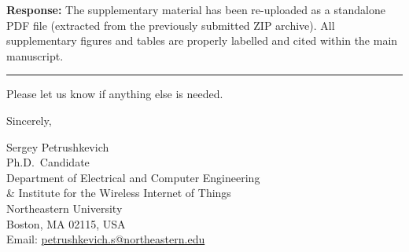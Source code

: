 \documentclass[11pt]{letter}
\begin{document}
\medskip
\noindent
\textbf{Response:} The supplementary material has been re-uploaded as a standalone PDF file (extracted from the previously submitted ZIP archive). All supplementary figures and tables are properly labelled and cited within the main manuscript.

\bigskip
\noindent
\rule{\textwidth}{0.4pt}

\bigskip
\noindent

Please let us know if anything else is needed.

\bigskip
\noindent
Sincerely,

\noindent
Sergey Petrushkevich\\
Ph.D.\ Candidate\\
Department of Electrical and Computer Engineering\\
\& Institute for the Wireless Internet of Things\\
Northeastern University\\
Boston, MA 02115, USA\\
Email: \href{mailto:petrushkevich.s@northeastern.edu}{petrushkevich.s@northeastern.edu}
\end{document}
